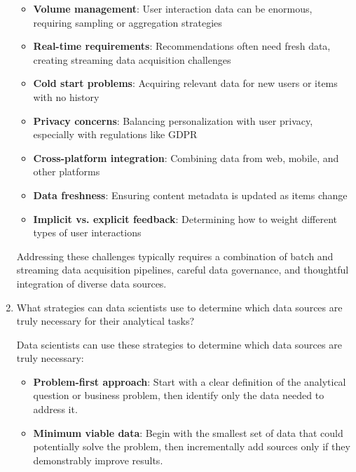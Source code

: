 \documentclass[12pt]{article}
\begin{document}
\begin{enumerate}
\begin{tcolorbox}[colback=blue!5!white,colframe=blue!75!black,title=Solution]
    \begin{itemize}
        \item \textbf{Volume management}: User interaction data can be enormous, requiring sampling or aggregation strategies
        \item \textbf{Real-time requirements}: Recommendations often need fresh data, creating streaming data acquisition challenges
        \item \textbf{Cold start problems}: Acquiring relevant data for new users or items with no history
        \item \textbf{Privacy concerns}: Balancing personalization with user privacy, especially with regulations like GDPR
        \item \textbf{Cross-platform integration}: Combining data from web, mobile, and other platforms
        \item \textbf{Data freshness}: Ensuring content metadata is updated as items change
        \item \textbf{Implicit vs. explicit feedback}: Determining how to weight different types of user interactions
    \end{itemize}
    
    Addressing these challenges typically requires a combination of batch and streaming data acquisition pipelines, careful data governance, and thoughtful integration of diverse data sources.
    \end{tcolorbox}
    
    \item What strategies can data scientists use to determine which data sources are truly necessary for their analytical tasks?
    
    \begin{tcolorbox}[colback=blue!5!white,colframe=blue!75!black,title=Solution]
    Data scientists can use these strategies to determine which data sources are truly necessary:
    
    \begin{itemize}
        \item \textbf{Problem-first approach}: Start with a clear definition of the analytical question or business problem, then identify only the data needed to address it.
        
        \item \textbf{Minimum viable data}: Begin with the smallest set of data that could potentially solve the problem, then incrementally add sources only if they demonstrably improve results.
        

\end{itemize}
\end{tcolorbox}
\end{enumerate}
\end{document}
